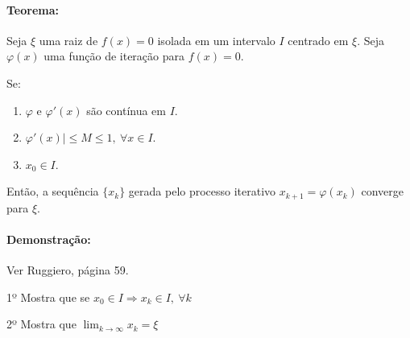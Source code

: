 \documentclass{article}
\begin{document}
        \paragraph{Teorema:} Seja $\xi$ uma raiz de $f(x)=0$ isolada em um intervalo $I$ centrado em $\xi$. Seja $\varphi(x)$ uma função de iteração para $f(x)=0$.

        Se:
        \begin{enumerate}[label= (\roman*)]
            \item $\varphi$ e $\varphi'(x)$ são contínua em $I$.
            \item\label{teorema_59_item_2} $\varphi'(x)| \leq M \leq 1,~\forall x \in I$.
            \item $x_0 \in I$.
        \end{enumerate}
        Então, a sequência $\{x_k\}$ gerada pelo processo iterativo $x_{k+1}=\varphi(x_k)$ converge para $\xi$.

        \paragraph{Demonstração:}Ver Ruggiero, página 59.
        \begin{description}
            \item 1º Mostra que se $x_0 \in I \Rightarrow x_k \in I,~\forall k$
            \item 2º Mostra que $\lim_{k \to \infty}{x_k} = \xi$
        \end{description}
\end{document}
